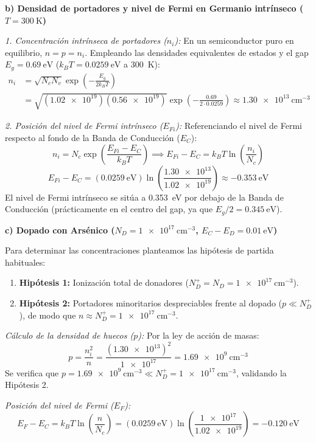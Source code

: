 \begin{problema}
\textbf{b) Densidad de portadores y nivel de Fermi en Germanio intrínseco ($T = \SI{300}{\kelvin}$)}

\textit{1. Concentración intrínseca de portadores ($n_i$):}
En un semiconductor puro en equilibrio, $n = p = n_i$. Empleando las densidades equivalentes de estados y el gap $E_g = \SI{0.69}{\eV}$ ($k_B T = \SI{0.0259}{\eV}$ a \SI{300}{\kelvin}):
\[
\begin{array}{rl}
    n_i & \displaystyle = \sqrt{N_c N_v} \exp\left( -\frac{E_g}{2 k_B T} \right) \\[4pt]
     & \displaystyle = \sqrt{(\num{1.02e19}) (\num{0.56e19})} \exp\left( -\frac{0.69}{2 \cdot 0.0259} \right) \approx \SI{1.30e13}{\cm^{-3}}
\end{array}
\]

\textit{2. Posición del nivel de Fermi intrínseco ($E_{Fi}$):}
Referenciando el nivel de Fermi respecto al fondo de la Banda de Conducción ($E_C$):
\[
n_i = N_c \exp\left( \frac{E_{Fi} - E_C}{k_B T} \right) \implies E_{Fi} - E_C = k_B T \ln\left( \frac{n_i}{N_c} \right)
\]
\[
E_{Fi} - E_C = (\SI{0.0259}{\eV}) \ln\left( \frac{\num{1.30e13}}{\num{1.02e19}} \right) \approx \SI{-0.353}{\eV}
\]
El nivel de Fermi intrínseco se sitúa a \SI{0.353}{\eV} por debajo de la Banda de Conducción (prácticamente en el centro del gap, ya que $E_g / 2 = \SI{0.345}{\eV}$).

\textbf{c) Dopado con Arsénico ($N_D = \SI{1e17}{\cm^{-3}}$, $E_C - E_D = \SI{0.01}{\eV}$)}

Para determinar las concentraciones planteamos las hipótesis de partida habituales:
\begin{enumerate}
    \item \textbf{Hipótesis 1:} Ionización total de donadores ($N_D^+ = N_D = \SI{1e17}{\cm^{-3}}$).
    \item \textbf{Hipótesis 2:} Portadores minoritarios despreciables frente al dopado ($p \ll N_D^+$), de modo que $n \approx N_D^+ = \SI{1e17}{\cm^{-3}}$.
\end{enumerate}

\textit{Cálculo de la densidad de huecos ($p$):}
Por la ley de acción de masas:
\[
p = \frac{n_i^2}{n} = \frac{(\num{1.30e13})^2}{\num{1e17}} = \SI{1.69e9}{\cm^{-3}}
\]
Se verifica que $p = \SI{1.69e9}{\cm^{-3}} \ll N_D^+ = \SI{1e17}{\cm^{-3}}$, validando la Hipótesis 2.

\textit{Posición del nivel de Fermi ($E_F$):}
\[
E_F - E_C = k_B T \ln\left( \frac{n}{N_c} \right) = (\SI{0.0259}{\eV}) \ln\left( \frac{\num{1e17}}{\num{1.02e19}} \right) = \SI{-0.120}{\eV}
\]


\end{problema}
